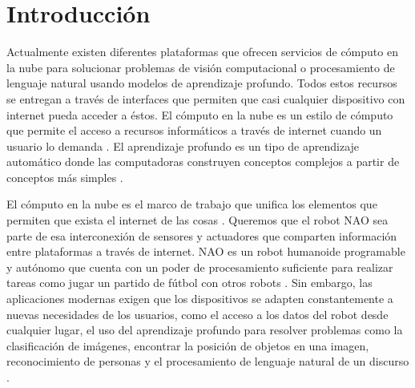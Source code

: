 

\chapter*{Introducción}
\label{\detokenize{introduction:cloudnao-una-arquitectura-de-software-para-la-integracion-de-computo-en-la-nube-con-robots-nao}}\label{\detokenize{introduction:introduccion}}\label{\detokenize{introduction::doc}}


Actualmente existen diferentes plataformas que 
ofrecen servicios
de cómputo en la nube para solucionar problemas de 
visión computacional \cite{googlevision2018} o
procesamiento de lenguaje natural \cite{witaidocs2018} usando modelos
de aprendizaje profundo. 
Todos estos recursos se entregan a través de 
interfaces que
permiten que casi cualquier dispositivo con 
internet
pueda acceder a éstos.
El cómputo en la nube es un estilo de cómputo que 
permite el acceso a 
recursos informáticos a través de internet cuando un
usuario lo demanda \cite{borkofurhtarmandoescalante2010}. El aprendizaje profundo es un 
tipo
de aprendizaje automático donde las computadoras 
construyen
conceptos complejos a partir de conceptos más 
simples \cite{iangoodfellowyoshuabengioaaroncourville2017}.


El cómputo en la nube es el marco de trabajo que
unifica los elementos que permiten que exista el
internet de las cosas \cite{jayavardhanagubbiarajkumarbuyyabslavenmarusicamarimuthupalaniswamia2013}. Queremos que el robot NAO 
sea parte de esa interconexión de sensores y actuadores
que comparten información entre plataformas
a través de internet.
NAO es un robot humanoide programable y autónomo
que cuenta con
un poder de procesamiento suficiente para realizar 
tareas como
jugar un partido de fútbol con otros robots \cite{splinfo2018}. Sin embargo,
las aplicaciones modernas
exigen que los dispositivos se adapten constantemente a nuevas necesidades
de los usuarios, como el acceso a los datos
del robot desde cualquier lugar, el uso del aprendizaje profundo para resolver problemas como la clasificación de imágenes,
encontrar
la posición de objetos en una imagen, reconocimiento
de personas y el 
procesamiento de lenguaje natural de un discurso \cite{benkehoesachinpatilpieterabbeelkengoldberg2014}.

